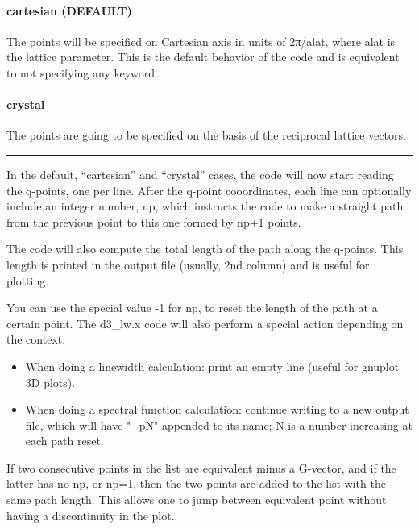 \documentclass[
]{article}
\providecommand{\tightlist}{%
  \setlength{\itemsep}{0pt}\setlength{\parskip}{0pt}}
\begin{document}
\hypertarget{cartesian-default}{%
\paragraph{cartesian (DEFAULT)}\label{cartesian-default}}

The points will be specified on Cartesian axis in units of 2π/alat,
where alat is the lattice parameter. This is the default behavior of the
code and is equivalent to not specifying any keyword.

\hypertarget{crystal}{%
\paragraph{crystal}\label{crystal}}

The points are going to be specified on the basis of the reciprocal
lattice vectors.

\begin{center}\rule{0.5\linewidth}{0.5pt}\end{center}

In the default, \enquote{cartesian} and \enquote{crystal} cases, the
code will now start reading the q-points, one per line. After the
q-point cooordinates, each line can optionally include an integer
number, np, which instructs the code to make a straight path from the
previous point to this one formed by np+1 points.

The code will also compute the total length of the path along the
q-points. This length is printed in the output file (usually, 2nd
column) and is useful for plotting.

You can use the special value -1 for np, to reset the length of the path
at a certain point. The d3\_lw.x code will also perform a special action
depending on the context:

\begin{itemize}
\tightlist
\item
  When doing a linewidth calculation: print an empty line (useful for
  gnuplot 3D plots).
\item
  When doing a spectral function calculation: continue writing to a new
  output file, which will have "\_pN" appended to its name; N is a
  number increasing at each path reset.
\end{itemize}

If two consecutive points in the list are equivalent minus a G-vector,
and if the latter has no np, or np=1, then the two points are added to
the list with the same path length. This allows one to jump between
equivalent point without having a discontinuity in the plot.
\end{document}
